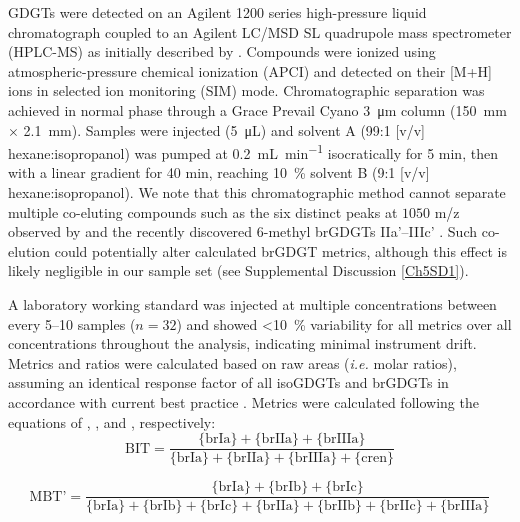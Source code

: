 GDGTs were detected on an Agilent 1200 series high-pressure liquid chromatograph coupled to an Agilent LC/MSD SL quadrupole mass spectrometer (HPLC-MS) as initially described by \citet{Hopmans:2000ti}. Compounds were ionized using atmospheric-pressure chemical ionization (APCI) and detected on their [M+H]\super{+} ions in selected ion monitoring (SIM) mode. Chromatographic separation was achieved in normal phase through a Grace Prevail Cyano \SI{3}{\micro m} column (\SI{150}{mm} $\times$ \SI{2.1}{mm}). Samples were injected (\SI{5}{\micro L}) and solvent A (99:1 [v/v] hexane:isopropanol) was pumped at \SI{0.2}{mL.min^{-1}} isocratically for 5 min, then with a linear gradient for 40 min, reaching \SI{10}{\%} solvent B (9:1 [v/v] hexane:isopropanol). We note that this chromatographic method cannot separate multiple co-eluting compounds such as the six distinct peaks at $1050$ m/z observed by \citet{Becker:2013jw} and the recently discovered 6-methyl brGDGTs IIa'--IIIc' \citep[see Figure \ref{Ch5Fig:S1} for structures;][]{DeJonge:2013cr,DeJonge:2014kw}. Such co-elution could potentially alter calculated brGDGT metrics, although this effect is likely negligible in our sample set (see Supplemental Discussion \ref{Ch5SD1}).

A laboratory working standard was injected at multiple concentrations between every \numrange{5}{10} samples ($n = 32$) and showed \SI{<10}{\%} variability for all metrics over all concentrations throughout the analysis, indicating minimal instrument drift. Metrics and ratios were calculated based on raw areas (\textit{i.e.} molar ratios), assuming an identical response factor of all isoGDGTs and brGDGTs in accordance with current best practice \citep{Schouten:2013hh,Schouten:2013bd}. Metrics were calculated following the equations of \citet{Hopmans:2004kx}, \citet{Peterse:2012bs}, and \citet{Weijers:2007gu}, respectively:
%
\begin{equation}\label{Ch5Eq:1}
	\text{BIT} = \frac{\{\text{brIa}\} + \{\text{brIIa}\} + \{\text{brIIIa}\}}{\{\text{brIa}\} + \{\text{brIIa}\} + \{\text{brIIIa}\} + \{\text{cren}\}}
\end{equation}

\begin{equation}\label{Ch5Eq:2}
	\text{MBT'} = \frac{\{\text{brIa}\} + \{\text{brIb}\} + \{\text{brIc}\}}{\{\text{brIa}\} + \{\text{brIb}\} + \{\text{brIc}\} + \{\text{brIIa}\} + \{\text{brIIb}\} + \{\text{brIIc}\} + \{\text{brIIIa}\}}
\end{equation}

